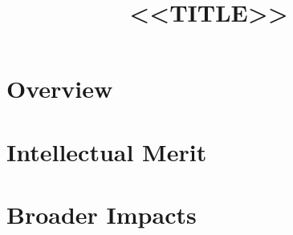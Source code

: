 \documentclass[11pt]{amsart}
\begin{document}
\title{<<TITLE>>}
\maketitle
\vspace{-0.9cm}

\section*{Overview}

\section*{Intellectual Merit}

\section*{Broader Impacts}
\end{document}
